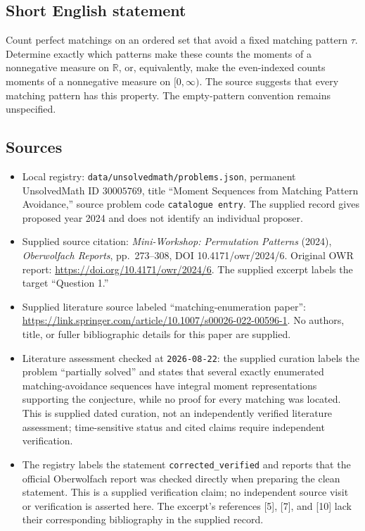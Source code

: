 \documentclass[11pt]{article}
\newcommand{\R}{\mathbb{R}}
\begin{document}
\subsection{Short English statement}
Count perfect matchings on an ordered set that avoid a fixed matching pattern \(\tau\). Determine exactly which patterns make these counts the moments of a nonnegative measure on \(\R\), or, equivalently, make the even-indexed counts moments of a nonnegative measure on \([0,\infty)\). The source suggests that every matching pattern has this property. The empty-pattern convention remains unspecified.
\subsection{Sources}
\begin{itemize}
\item Local registry: \texttt{data/unsolvedmath/problems.json}, permanent UnsolvedMath ID \(30005769\), title ``Moment Sequences from Matching Pattern Avoidance,'' source problem code \texttt{catalogue entry}. The supplied record gives proposed year 2024 and does not identify an individual proposer.
\item Supplied source citation: \emph{Mini-Workshop: Permutation Patterns} (2024), \emph{Oberwolfach Reports}, pp.\ 273--308, DOI 10.4171/owr/2024/6. Original OWR report: \url{https://doi.org/10.4171/owr/2024/6}. The supplied excerpt labels the target ``Question 1.''
\item Supplied literature source labeled ``matching-enumeration paper'': \url{https://link.springer.com/article/10.1007/s00026-022-00596-1}. No authors, title, or fuller bibliographic details for this paper are supplied.
\item Literature assessment checked at \texttt{2026-08-22}: the supplied curation labels the problem ``partially solved'' and states that several exactly enumerated matching-avoidance sequences have integral moment representations supporting the conjecture, while no proof for every matching was located. This is supplied dated curation, not an independently verified literature assessment; time-sensitive status and cited claims require independent verification.
\item The registry labels the statement \texttt{corrected\_verified} and reports that the official Oberwolfach report was checked directly when preparing the clean statement. This is a supplied verification claim; no independent source visit or verification is asserted here. The excerpt's references [5], [7], and [10] lack their corresponding bibliography in the supplied record.
\end{itemize}
\end{document}
